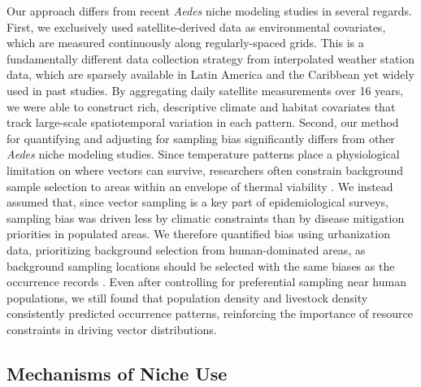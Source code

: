 Our approach differs from recent \textit{Aedes} niche modeling studies in several regards. First, we exclusively used satellite-derived data as environmental covariates, which are measured continuously along regularly-spaced grids. This is a fundamentally different data collection strategy from interpolated weather station data, which are sparsely available in Latin America and the Caribbean \cite{Fick2017-am} yet widely used in past studies. By aggregating daily satellite measurements over 16 years, we were able to construct rich, descriptive climate and habitat covariates that track large-scale spatiotemporal variation in each pattern. Second, our method for quantifying and adjusting for sampling bias significantly differs from other \textit{Aedes} niche modeling studies. Since temperature patterns place a physiological limitation on where vectors can survive, researchers often constrain background sample selection to areas within an envelope of thermal viability \cite{Brady2012-tg, Bhatt2013-qa, Kraemer2015-ct}. We instead assumed that, since vector sampling is a key part of epidemiological surveys, sampling bias was driven less by climatic constraints than by disease mitigation priorities in populated areas. We therefore quantified bias using urbanization data, prioritizing background selection from human-dominated areas, as background sampling locations should be selected with the same biases as the occurrence records \cite{Phillips2009-nf, Barbet-Massin2012-pn, Fourcade2018-ws}. Even after controlling for preferential sampling near human populations, we still found that population density and livestock density consistently predicted occurrence patterns, reinforcing the importance of resource constraints in driving vector distributions.

\subsection{Mechanisms of Niche Use}

